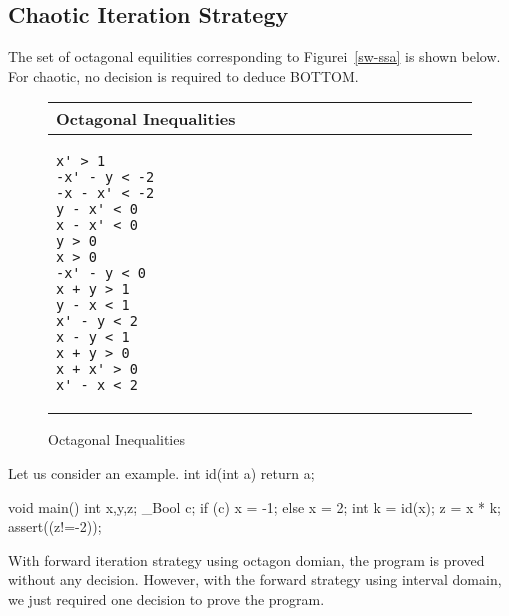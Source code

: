 \subsection{Chaotic Iteration Strategy}  
The set of octagonal equilities corresponding to Figurei~\ref{sw-ssa}
is shown below. For chaotic, no decision is required to deduce BOTTOM.
\begin{figure}[t]
\scriptsize
\begin{tabular}{l}
\hline
Octagonal Inequalities \\
\hline
\begin{lstlisting}
x' > 1                                                                      
-x' - y < -2                                                               
-x - x' < -2                                                               
y - x' < 0                                                                 
x - x' < 0                                                                 
y > 0                                                                       
x > 0                                                                       
-x' - y < 0                                                                
x + y > 1                                                                 
y - x < 1                                                                 
x' - y < 2                                                                 
x - y < 1                                                                 
x + y > 0                                                                 
x + x' > 0                                                                 
x' - x < 2  
\end{lstlisting}
\\
\hline
\end{tabular}
\caption{Octagonal Inequalities}
\label{octagons}
\end{figure}


Let us consider an example. 
int id(int a)
{
  return a;
}

void main() {
 int x,y,z;
 \_Bool c;
 if (c)
   x = -1;
 else
   x = 2;
 int k = id(x);
 z = x * k;
 assert((z!=-2));
}

With forward iteration strategy using octagon domian, the program 
is proved without any decision. However, with the forward strategy
using interval domain, we just required one decision to prove the program. 
